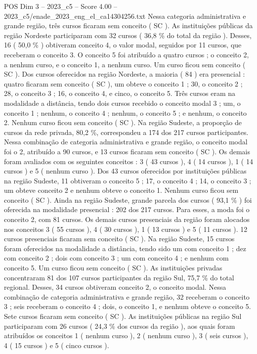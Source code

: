 \begin{textsample}{POS Dim 3 – 2023\_c5 – Score 4.00 – 2023\_c5/enade\_2023\_eng\_el\_ca14304256.txt}
Nessa categoria administrativa e grande região, três cursos ficaram sem conceito ( SC ).
As instituições públicas da região Nordeste participaram com 32 cursos ( 36,8 \% do total da região ).
Desses, 16 ( 50,0 \% ) obtiveram conceito 4, o valor modal, seguidos por 11 cursos, que receberam o conceito 3.
O conceito 5 foi atribuído a quatro cursos ; o conceito 2, a nenhum curso, e o conceito 1, a nenhum curso.
Um curso ficou sem conceito ( SC ).
Dos cursos oferecidos na região Nordeste, a maioria ( 84 ) era presencial : quatro ficaram sem conceito ( SC ), um obteve o conceito 1 ; 30, o conceito 2 ; 28, o conceito 3 ; 16, o conceito 4, e cinco, o conceito 5.
Três cursos eram na modalidade a distância, tendo dois cursos recebido o conceito modal 3 ; um, o conceito 1 ; nenhum, o conceito 4 ; nenhum, o conceito 5 ; e nenhum, o conceito 2.
Nenhum curso ficou sem conceito ( SC ).
Na região Sudeste, a proporção de cursos da rede privada, 80,2 \%, correspondeu a 174 dos 217 cursos participantes.
Nessa combinação de categoria administrativa e grande região, o conceito modal foi o 2, atribuído a 90 cursos, e 13 cursos ficaram sem conceito ( SC ).
Os demais foram avaliados com os seguintes conceitos : 3 ( 43 cursos ), 4 ( 14 cursos ), 1 ( 14 cursos ) e 5 ( nenhum curso ).
Dos 43 cursos oferecidos por instituições públicas na região Sudeste, 11 obtiveram o conceito 5 ; 17, o conceito 4 ; 14, o conceito 3 ; um obteve conceito 2 e nenhum obteve o conceito 1.
Nenhum curso ficou sem conceito ( SC ).
Ainda na região Sudeste, grande parcela dos cursos ( 93,1 \% ) foi oferecida na modalidade presencial : 202 dos 217 cursos.
Para esses, a moda foi o conceito 2, com 81 cursos.
Os demais cursos presenciais da região foram alocados nos conceitos 3 ( 55 cursos ), 4 ( 30 cursos ), 1 ( 13 cursos ) e 5 ( 11 cursos ). 12 cursos presenciais ficaram sem conceito ( SC ).
Na região Sudeste, 15 cursos foram oferecidos na modalidade a distância, tendo sido um com conceito 1 ; dez com conceito 2 ; dois com conceito 3 ; um com conceito 4 ; e nenhum com conceito 5.
Um curso ficou sem conceito ( SC ).
As instituições privadas concentraram 81 dos 107 cursos participantes da região Sul, 75,7 \% do total regional.
Desses, 34 cursos obtiveram conceito 2, o conceito modal.
Nessa combinação de categoria administrativa e grande região, 32 receberam o conceito 3 ; seis receberam o conceito 4 ; dois, o conceito 1, e nenhum obteve o conceito 5.
Sete cursos ficaram sem conceito ( SC ).
As instituições públicas na região Sul participaram com 26 cursos ( 24,3 \% dos cursos da região ), aos quais foram atribuídos os conceitos 1 ( nenhum curso ), 2 ( nenhum curso ), 3 ( seis cursos ), 4 ( 15 cursos ) e 5 ( cinco cursos ).

\end{textsample}
